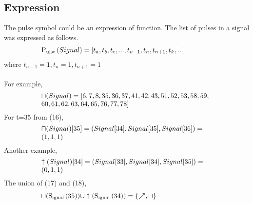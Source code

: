 \documentclass[10pt,journal]{IEEEtran}
\begin{document}
\subsection{Expression}
The pulse symbol could be an expression of function. The list of pulses     in a signal was expressed as follows.
\begin{equation}
 \begin{minipage}{250pt}
\begin{flushleft} $\displaystyle \operatorname{P_{ulse}}{\left(Signal \right)} = [t_{a},t_{b},t_{c},... ,t_{n-1},t_{n},t_{n+1},    t_{k}, ...]$  \end{flushleft}
 \end{minipage}
 \end{equation}
where $t_{n-1}=1,t_{n}=1,t_{n+1}=1$ \\ \ \\ For example,
\begin{equation}
 \begin{minipage}{250pt}
\begin{flushleft} $\displaystyle \sqcap{\left(Signal \right)} = [6, 7, 8, 35, 36, 37, 41, 42, 43, 51, 52, 53, 58, 59, \newline  60, 61, 62, 63, 64, 65, 76, 77, 78]$  \end{flushleft}
 \end{minipage}
 \end{equation}
For t=35 from (16), 
\begin{equation}
 \begin{minipage}{250pt}
\begin{flushleft} $\displaystyle \sqcap{\left(Signal \right)}[35] = (Signal[34], Signal[35], Signal[36]) = (1,1,1)$  \end{flushleft}
 \end{minipage}
 \end{equation}
Another example,
\begin{equation}
 \begin{minipage}{250pt}
\begin{flushleft} $\displaystyle \uparrow{\left(Signal \right)}[34] = (Signal[33], Signal[34], Signal[35]) = (0,1,1)$  \end{flushleft}
 \end{minipage}
 \end{equation}
The union of (17) and (18), 
\begin{equation}
 \begin{minipage}{250pt}
\begin{flushleft} $\displaystyle \sqcap{\left(\operatorname{S_{ignal}}{\left(35 \right)} \right)}  \cup  \uparrow{\left(\operatorname{S_{ignal}}{\left(34 \right)} \right)} = \left\{\nearrow, \sqcap\right\}$  \end{flushleft}
 \end{minipage}
 \end{equation}
\end{document}
